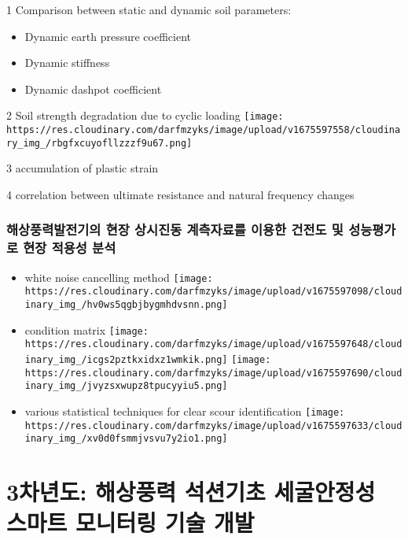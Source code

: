 \documentclass[
  letterpaper,
  DIV=11,
  numbers=noendperiod]{scrreprt}
\providecommand{\tightlist}{%
  \setlength{\itemsep}{0pt}\setlength{\parskip}{0pt}}\usepackage{longtable,booktabs,array}
\begin{document}
1 Comparison between static and dynamic soil parameters:

\begin{itemize}
\tightlist
\item
  Dynamic earth pressure coefficient
\item
  Dynamic stiffness
\item
  Dynamic dashpot coefficient
\end{itemize}

2 Soil strength degradation due to cyclic loading
\texttt{[image: https://res.cloudinary.com/darfmzyks/image/upload/v1675597558/cloudinary\_img\_/rbgfxcuyofllzzzf9u67.png]}

3 accumulation of plastic strain

4 correlation between ultimate resistance and natural frequency changes

\hypertarget{uxd574uxc0c1uxd48duxb825uxbc1cuxc804uxae30uxc758-uxd604uxc7a5-uxc0c1uxc2dcuxc9c4uxb3d9-uxacc4uxce21uxc790uxb8ccuxb97c-uxc774uxc6a9uxd55c-uxac74uxc804uxb3c4-uxbc0f-uxc131uxb2a5uxd3c9uxac00uxb85c-uxd604uxc7a5-uxc801uxc6a9uxc131-uxbd84uxc11d}{%
\subsubsection{해상풍력발전기의 현장 상시진동 계측자료를 이용한 건전도
및 성능평가로 현장 적용성
분석}\label{uxd574uxc0c1uxd48duxb825uxbc1cuxc804uxae30uxc758-uxd604uxc7a5-uxc0c1uxc2dcuxc9c4uxb3d9-uxacc4uxce21uxc790uxb8ccuxb97c-uxc774uxc6a9uxd55c-uxac74uxc804uxb3c4-uxbc0f-uxc131uxb2a5uxd3c9uxac00uxb85c-uxd604uxc7a5-uxc801uxc6a9uxc131-uxbd84uxc11d}}

\begin{itemize}
\item
  white noise cancelling method
  \texttt{[image: https://res.cloudinary.com/darfmzyks/image/upload/v1675597098/cloudinary\_img\_/hv0ws5qgbjbygmhdvsnn.png]}
\item
  condition matrix
  \texttt{[image: https://res.cloudinary.com/darfmzyks/image/upload/v1675597648/cloudinary\_img\_/icgs2pztkxidxz1wmkik.png]}
  \texttt{[image: https://res.cloudinary.com/darfmzyks/image/upload/v1675597690/cloudinary\_img\_/jvyzsxwupz8tpucyyiu5.png]}
\item
  various statistical techniques for clear scour identification
  \texttt{[image: https://res.cloudinary.com/darfmzyks/image/upload/v1675597633/cloudinary\_img\_/xv0d0fsmmjvsvu7y2io1.png]}
\end{itemize}

\hypertarget{uxcc28uxb144uxb3c4-uxd574uxc0c1uxd48duxb825-uxc11duxc158uxae30uxcd08-uxc138uxad74uxc548uxc815uxc131-uxc2a4uxb9c8uxd2b8-uxbaa8uxb2c8uxd130uxb9c1-uxae30uxc220-uxac1cuxbc1c}{%
\section{\texorpdfstring{\textbf{3차년도:} 해상풍력 석션기초 세굴안정성
스마트 모니터링 기술
개발}{3차년도: 해상풍력 석션기초 세굴안정성 스마트 모니터링 기술 개발}}\label{uxcc28uxb144uxb3c4-uxd574uxc0c1uxd48duxb825-uxc11duxc158uxae30uxcd08-uxc138uxad74uxc548uxc815uxc131-uxc2a4uxb9c8uxd2b8-uxbaa8uxb2c8uxd130uxb9c1-uxae30uxc220-uxac1cuxbc1c}}
\end{document}
